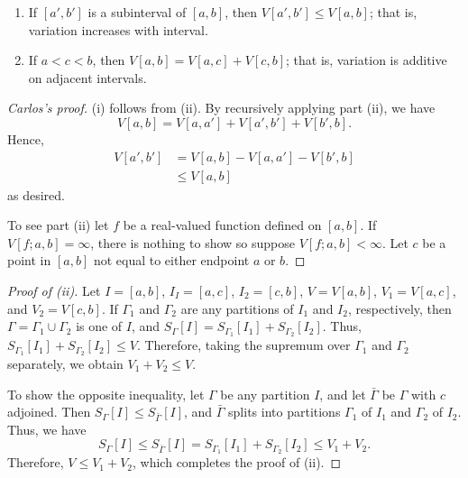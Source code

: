 \begin{theorem}[2.2]
\begin{enumerate}[label=\textnormal{(\roman*)}]
\item If $[a',b']$ is a subinterval of $[a,b]$, then
  $V[a',b']\leq V[a,b]$; that is, variation increases with interval.
\item If $a<c<b$, then $V[a,b]=V[a,c]+V[c,b]$; that is, variation
  is additive on adjacent intervals.
\end{enumerate}
\end{theorem}
\begin{proof}[Carlos's proof]
(i) follows from (ii). By recursively applying part (ii), we have
\[
V[a,b]=V[a,a']+V[a',b']+V[b',b].
\]
Hence,
\begin{align*}
V[a',b']&=V[a,b]-V[a,a']-V[b',b]\\
           &\leq V[a,b]
\end{align*}
as desired.

To see part (ii) let $f$ be a real-valued function defined on $[a,b]$. If
$V[f;a,b]=\infty$, there is nothing to show so suppose
$V[f;a,b]<\infty$. Let $c$ be a point in $[a,b]$ not equal to either
endpoint $a$ or $b$.
\end{proof}
\begin{proof}[Proof of (ii)]
Let $I= [a,b]$, $I_I= [a,c]$, $I_2= [c,b]$,
$V= V[a,b]$, $V_1= V[a,c]$, and $V_2= V[c,b]$. If
$\Gamma_1$ and $\Gamma_2$ are any partitions of $I_1$ and $I_2$,
respectively, then $\Gamma=\Gamma_1\cup\Gamma_2$ is one of $I$, and
$S_\Gamma[I]=S_{\Gamma_1}[I_1]+S_{\Gamma_2}[I_2]$. Thus,
$S_{\Gamma_1}[I_1]+S_{\Gamma_2}[I_2]\leq V$. Therefore, taking the supremum
over $\Gamma_1$ and $\Gamma_2$ separately, we obtain $V_1+V_2\leq V$.

To show the opposite inequality, let $\Gamma$ be any partition $I$, and let
$\bar\Gamma$ be $\Gamma$ with $c$ adjoined. Then $S_\Gamma[I]\leq
S_{\bar\Gamma}[I]$, and $\bar\Gamma$ splits into partitions
$\Gamma_1$ of $I_1$ and $\Gamma_2$ of $I_2$. Thus, we have
\[
S_\Gamma[I]\leq
S_{\bar\Gamma}[I]=S_{\Gamma_1}[I_1]+S_{\Gamma_2}[I_2]\leq V_1+V_2.
\]
Therefore, $V\leq V_1+V_2$, which completes the proof of (ii).
\end{proof}

